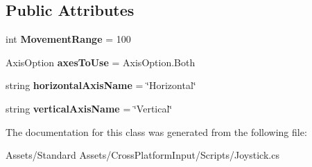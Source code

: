 \subsection*{Public Attributes}
\begin{DoxyCompactItemize}
\item 
int {\bfseries Movement\+Range} = 100\hypertarget{class_unity_standard_assets_1_1_cross_platform_input_1_1_joystick_a7309ba63c7e16cfb230130b0ba1f8bd4}{}\label{class_unity_standard_assets_1_1_cross_platform_input_1_1_joystick_a7309ba63c7e16cfb230130b0ba1f8bd4}

\item 
Axis\+Option {\bfseries axes\+To\+Use} = Axis\+Option.\+Both\hypertarget{class_unity_standard_assets_1_1_cross_platform_input_1_1_joystick_aa0a6ed91c54506a11323b7a9ac75af46}{}\label{class_unity_standard_assets_1_1_cross_platform_input_1_1_joystick_aa0a6ed91c54506a11323b7a9ac75af46}

\item 
string {\bfseries horizontal\+Axis\+Name} = \char`\"{}Horizontal\char`\"{}\hypertarget{class_unity_standard_assets_1_1_cross_platform_input_1_1_joystick_a1a2343df2c18d9afa642d6131bc0e5ad}{}\label{class_unity_standard_assets_1_1_cross_platform_input_1_1_joystick_a1a2343df2c18d9afa642d6131bc0e5ad}

\item 
string {\bfseries vertical\+Axis\+Name} = \char`\"{}Vertical\char`\"{}\hypertarget{class_unity_standard_assets_1_1_cross_platform_input_1_1_joystick_ab131c9265b8fa58aa7b22e3442c4aff7}{}\label{class_unity_standard_assets_1_1_cross_platform_input_1_1_joystick_ab131c9265b8fa58aa7b22e3442c4aff7}

\end{DoxyCompactItemize}


The documentation for this class was generated from the following file\+:\begin{DoxyCompactItemize}
\item 
Assets/\+Standard Assets/\+Cross\+Platform\+Input/\+Scripts/Joystick.\+cs\end{DoxyCompactItemize}
